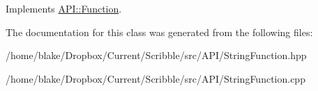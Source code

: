 Implements \hyperlink{class_a_p_i_1_1_function_ae56761ad4c849c05e12cb4cd02583c77}{A\-P\-I\-::\-Function}.



The documentation for this class was generated from the following files\-:\begin{DoxyCompactItemize}
\item 
/home/blake/\-Dropbox/\-Current/\-Scribble/src/\-A\-P\-I/String\-Function.\-hpp\item 
/home/blake/\-Dropbox/\-Current/\-Scribble/src/\-A\-P\-I/String\-Function.\-cpp\end{DoxyCompactItemize}
